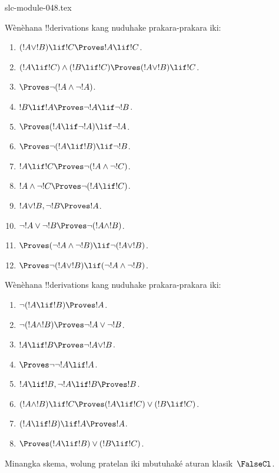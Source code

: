 \begin{filecontents*}[overwrite]{slc-module-048.tex}
\begin{prob}
Wènèhana !!{derivation}s kang nuduhake prakara-prakara iki:
\begin{enumerate}
\item $(!A \lor !B) \lif !C \Proves !A \lif !C$.
\item $(!A \lif !C) \land (!B \lif !C) \Proves (!A \lor !B) \lif !C$.
\item $\Proves \lnot(!A \land \lnot !A)$.
\item $!B \lif !A \Proves \lnot !A \lif \lnot !B$.
\item $\Proves (!A \lif \lnot !A) \lif \lnot !A$.
\item $\Proves \lnot(!A \lif !B) \lif \lnot !B$.
\item $!A \lif !C \Proves \lnot (!A \land \lnot !C)$.
\item $!A \land \lnot !C \Proves \lnot (!A \lif !C)$.
\item $!A \lor !B, \lnot !B \Proves !A$.
\item $\lnot !A \lor \lnot !B \Proves \lnot(!A \land !B)$.
\item $\Proves (\lnot !A \land \lnot !B) \lif\lnot(!A \lor !B)$.
\item $\Proves \lnot(!A \lor !B) \lif (\lnot !A \land \lnot !B)$.
\end{enumerate}
\end{prob}

\begin{prob}
Wènèhana !!{derivation}s kang nuduhake prakara-prakara iki:
\begin{enumerate}
\item $\lnot(!A \lif !B) \Proves !A$.
\item $\lnot(!A \land !B) \Proves \lnot !A \lor \lnot !B$.
\item $!A \lif !B \Proves \lnot !A \lor !B$.
\item $\Proves \lnot \lnot !A \lif !A$.
\item $!A \lif !B, \lnot !A \lif !B \Proves !B$.
\item $(!A \land !B) \lif !C \Proves (!A \lif !C) \lor (!B \lif !C)$.
\item $(!A \lif !B) \lif !A \Proves !A$.
\item $\Proves (!A \lif !B) \lor (!B \lif !C)$.
\end{enumerate}
Minangka skema, wolung pratelan iki mbutuhaké aturan klasik~$\FalseCl$.
\end{prob}


\end{filecontents*}

